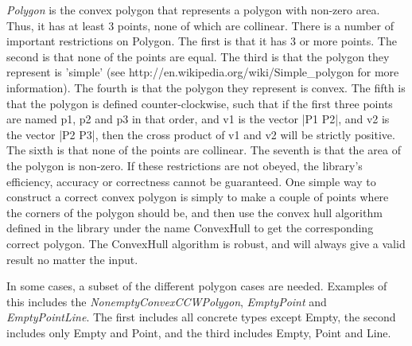 \textit{Polygon} is the convex polygon that represents a polygon with
non-zero area. Thus, it has at least 3 points, none of which are collinear.
There is a number of important restrictions on Polygon. The first is that
it has 3 or more points. The second is that none of the points are equal.
The third is that the polygon they represent is 'simple'
(see http://en.wikipedia.org/wiki/Simple\_polygon for more information).
The fourth is that the polygon they represent is convex.
The fifth is that the polygon is defined counter-clockwise, such that
if the first three points are named p1, p2 and p3 in that order,
and v1 is the vector |P1 P2|, and v2 is the vector |P2 P3|,
then the cross product of v1 and v2 will be strictly positive.
The sixth is that none of the points are collinear.
The seventh is that the area of the polygon is non-zero.
If these restrictions are not obeyed, the library's efficiency,
accuracy or correctness cannot be guaranteed.
One simple way to construct a correct convex polygon is simply to
make a couple of points where the corners of the polygon should be,
and then use the convex hull algorithm defined in the library
under the name ConvexHull to get the corresponding correct polygon.
The ConvexHull algorithm is robust, and will always give a valid result
no matter the input.

In some cases, a subset of the different polygon cases are needed.
Examples of this includes the \textit{NonemptyConvexCCWPolygon},
\textit{EmptyPoint} and \textit{EmptyPointLine}.
The first includes all concrete types except Empty,
the second includes only Empty and Point, and the third includes
Empty, Point and Line.

